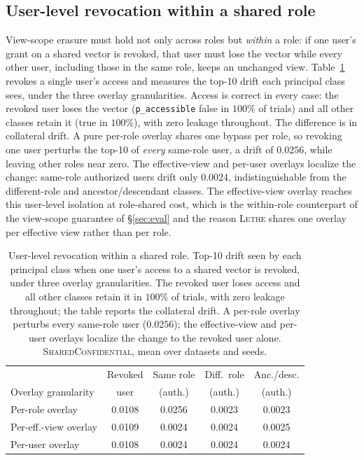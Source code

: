 \documentclass[sigconf, nonacm, review]{acmart}
\begin{document}
\subsection{User-level revocation within a shared role}
\label{app:samerole}
View-scope erasure must hold not only across roles but \emph{within} a role: if
one user's grant on a shared vector is revoked, that user must lose the vector
while every other user, including those in the same role, keeps an unchanged
view. Table~\ref{tab:samerole} revokes a single user's access and measures the
top-10 drift each principal class sees, under the three overlay granularities.
Access is correct in every case: the revoked user loses the vector
(\texttt{p\_accessible} false in $100\%$ of trials) and all other classes retain
it (true in $100\%$), with zero leakage throughout. The difference is in
collateral drift. A pure per-role overlay shares one bypass per role, so
revoking one user perturbs the top-10 of \emph{every} same-role user, a drift of
$0.0256$, while leaving other roles near zero. The effective-view and per-user
overlays localize the change: same-role authorized users drift only $0.0024$,
indistinguishable from the different-role and ancestor/descendant classes. The
effective-view overlay reaches this user-level isolation at role-shared cost,
which is the within-role counterpart of the view-scope guarantee of
\S\ref{sec:eval} and the reason \textsc{Lethe} shares one overlay per effective
view rather than per role.

\begin{table}[t]
\centering
\caption{User-level revocation within a shared role. Top-10 drift seen by each
principal class when one user's access to a shared vector is revoked, under
three overlay granularities. The revoked user loses access and all other classes
retain it in $100\%$ of trials, with zero leakage throughout; the table reports
the collateral drift. A per-role overlay perturbs every same-role user
($0.0256$); the effective-view and per-user overlays localize the change to the
revoked user alone. \textsc{SharedConfidential}, mean over datasets and seeds.}
\label{tab:samerole}
\small
\setlength{\tabcolsep}{6pt}
\begin{tabular}{@{}lcccc@{}}
\toprule
& Revoked & Same role & Diff.\ role & Anc./desc. \\
Overlay granularity & user & (auth.) & (auth.) & (auth.) \\
\midrule
Per-role overlay & 0.0108 & 0.0256 & 0.0023 & 0.0023 \\
Per-eff.-view overlay & 0.0109 & 0.0024 & 0.0024 & 0.0025 \\
Per-user overlay & 0.0108 & 0.0024 & 0.0024 & 0.0024 \\
\bottomrule
\end{tabular}
\end{table}
\end{document}
